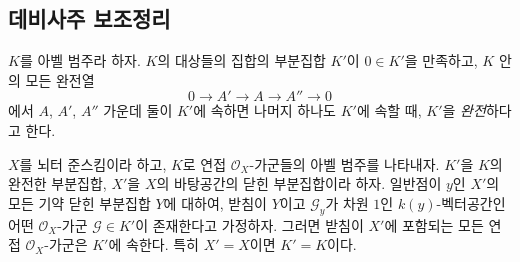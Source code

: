 \subsection{데비사주 보조정리}
\label{subsection:III.3.1-fr}

\begin{definition}[3.1.1]
\label{III.3.1.1-fr}
$K$를 아벨 범주라 하자. $K$의 대상들의 집합의 부분집합 $K'$이
$0\in K'$을 만족하고, $K$ 안의 모든 완전열
\[
0\longrightarrow A'\longrightarrow A\longrightarrow A''\longrightarrow0
\]
에서 $A$, $A'$, $A''$ 가운데 둘이 $K'$에 속하면 나머지 하나도
$K'$에 속할 때, $K'$을 \emph{완전}하다고 한다.
\end{definition}

\begin{theorem}[3.1.2]
\label{III.3.1.2-fr}
$X$를 뇌터 준스킴이라 하고, $K$로 연접 $\mathcal O_X$-가군들의 아벨
범주를 나타내자. $K'$을 $K$의 완전한 부분집합, $X'$을 $X$의
바탕공간의 닫힌 부분집합이라 하자. 일반점이 $y$인 $X'$의 모든 기약
닫힌 부분집합 $Y$에 대하여, 받침이 $Y$이고 $\mathcal G_y$가 차원
$1$인 $k(y)$-벡터공간인 어떤 $\mathcal O_X$-가군
$\mathcal G\in K'$이 존재한다고 가정하자. 그러면 받침이 $X'$에
포함되는 모든 연접 $\mathcal O_X$-가군은 $K'$에 속한다. 특히
$X'=X$이면 $K'=K$이다.
\end{theorem}

